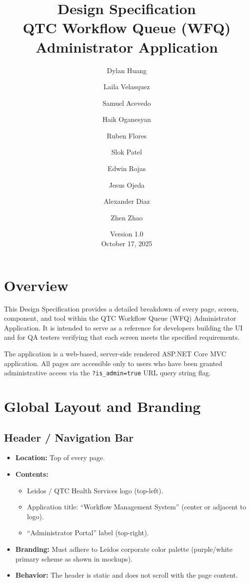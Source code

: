 \documentclass[12pt]{article}
\title{Design Specification\\
\large QTC Workflow Queue (WFQ) Administrator Application}
\author{Dylan Huang \and Laila Velasquez \and Samuel Acevedo \and Haik Oganesyan \\
\and Ruben Flores \and Slok Patel \and Edwin Rojas \and Jesus Ojeda \\
\and Alexander Diaz \and Zhen Zhao}
\date{Version 1.0 \\ October 17, 2025}
\begin{document}
\maketitle
\newpage
\tableofcontents
\newpage

\section{Overview}

This Design Specification provides a detailed breakdown of every page, screen, component, and
tool within the QTC Workflow Queue (WFQ) Administrator Application. It is intended to serve
as a reference for developers building the UI and for QA testers verifying that each screen
meets the specified requirements.

The application is a web-based, server-side rendered ASP.NET Core MVC application. All pages
are accessible only to users who have been granted administrative access via the
\texttt{?is\_admin=true} URL query string flag.

\section{Global Layout and Branding}

\subsection{Header / Navigation Bar}
\begin{itemize}
    \item \textbf{Location:} Top of every page.
    \item \textbf{Contents:}
    \begin{itemize}
        \item Leidos / QTC Health Services logo (top-left).
        \item Application title: ``Workflow Management System'' (center or adjacent to logo).
        \item ``Administrator Portal'' label (top-right).
    \end{itemize}
    \item \textbf{Branding:} Must adhere to Leidos corporate color palette (purple/white
    primary scheme as shown in mockups).
    \item \textbf{Behavior:} The header is static and does not scroll with the page content.
\end{itemize}
\end{document}
